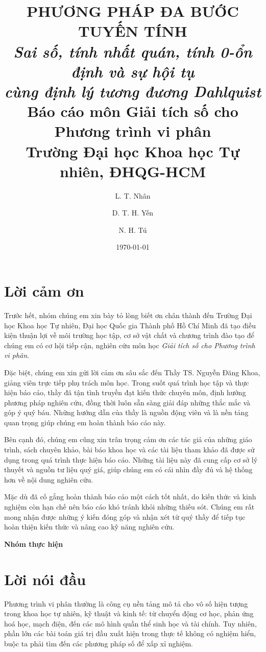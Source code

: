 \documentclass[12pt,a4paper]{article}
\title{\color{titleblue}\textbf{PHƯƠNG PHÁP ĐA BƯỚC TUYẾN TÍNH}\\[0.4em]
\large \textit{\color{black}Sai số, tính nhất quán, tính 0-ổn định và sự hội tụ}\\[0.2em]
\large \textit{\color{black}cùng định lý tương đương Dahlquist}\\[0.8em]
\normalsize \color{black}Báo cáo môn Giải tích số cho Phương trình vi phân\\[0.2em]
\normalsize \color{black}Trường Đại học Khoa học Tự nhiên, ĐHQG-HCM}
\author{L. T. Nhân \and D. T. H. Yến \and N. H. Tú}
\date{\today}
\begin{document}
\maketitle
\tableofcontents
\newpage

\newpage
\section*{Lời cảm ơn}

Trước hết, nhóm chúng em xin bày tỏ lòng biết ơn chân thành đến Trường Đại học Khoa học Tự nhiên, Đại học Quốc gia Thành phố Hồ Chí Minh đã tạo điều kiện thuận lợi về môi trường học tập, cơ sở vật chất và chương trình đào tạo để chúng em có cơ hội tiếp cận, nghiên cứu môn học \textit{Giải tích số cho Phương trình vi phân}.

Đặc biệt, chúng em xin gửi lời cảm ơn sâu sắc đến Thầy TS. Nguyễn Đăng Khoa, giảng viên trực tiếp phụ trách môn học. Trong suốt quá trình học tập và thực hiện báo cáo, thầy đã tận tình truyền đạt kiến thức chuyên môn, định hướng phương pháp nghiên cứu, đồng thời luôn sẵn sàng giải đáp những thắc mắc và góp ý quý báu. Những hướng dẫn của thầy là nguồn động viên và là nền tảng quan trọng giúp chúng em hoàn thành báo cáo này.

Bên cạnh đó, chúng em cũng xin trân trọng cảm ơn các tác giả của những giáo trình, sách chuyên khảo, bài báo khoa học và các tài liệu tham khảo đã được sử dụng trong quá trình thực hiện báo cáo. Những tài liệu này đã cung cấp cơ sở lý thuyết và nguồn tư liệu quý giá, giúp chúng em có cái nhìn đầy đủ và hệ thống hơn về nội dung nghiên cứu.

Mặc dù đã cố gắng hoàn thành báo cáo một cách tốt nhất, do kiến thức và kinh nghiệm còn hạn chế nên báo cáo khó tránh khỏi những thiếu sót. Chúng em rất mong nhận được những ý kiến đóng góp và nhận xét từ quý thầy để tiếp tục hoàn thiện kiến thức và nâng cao kỹ năng nghiên cứu.

\vspace{0.5cm}
\begin{flushright}
\textbf{Nhóm thực hiện}
\end{flushright}

\newpage
\section*{Lời nói đầu}
Phương trình vi phân thường là công cụ nền tảng mô tả cho vô số hiện tượng trong khoa học tự nhiên, kỹ thuật và kinh tế: từ chuyển động cơ học, phản ứng hoá học, mạch điện, đến các mô hình quần thể sinh học và tài chính. Tuy nhiên, phần lớn các bài toán giá trị đầu xuất hiện trong thực tế không có nghiệm hiển, buộc ta phải tìm đến các phương pháp số để xấp xỉ nghiệm.
\end{document}
